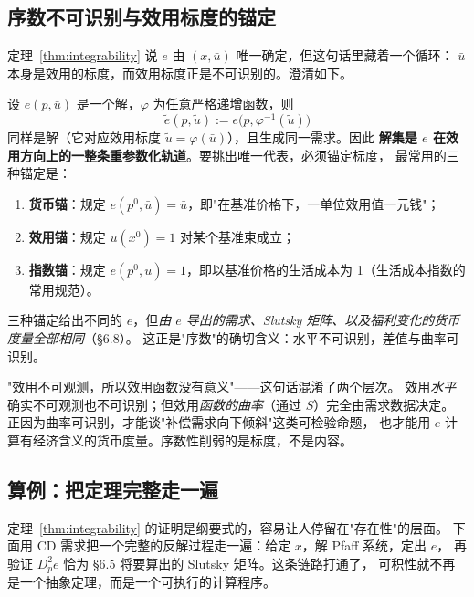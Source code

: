 \subsection{序数不可识别与效用标度的锚定}

定理~\ref{thm:integrability} 说 $e$ 由 $(x,\bar u)$ 唯一确定，但这句话里藏着一个循环：
$\bar u$ 本身是效用的标度，而效用标度正是不可识别的。澄清如下。

设 $e(p,\bar u)$ 是一个解，$\varphi$ 为任意严格递增函数，则
\[
 \tilde e(p,\tilde u):=e\bigl(p,\varphi^{-1}(\tilde u)\bigr)
\]
同样是解（它对应效用标度 $\tilde u=\varphi(\bar u)$），且生成同一需求。因此
\textbf{解集是 $e$ 在效用方向上的一整条重参数化轨道}。要挑出唯一代表，必须锚定标度，
最常用的三种锚定是：
\begin{enumerate}
\item \textbf{货币锚}：规定 $e(p^0,\bar u)=\bar u$，即"在基准价格下，一单位效用值一元钱"；
\item \textbf{效用锚}：规定 $u(x^0)=1$ 对某个基准束成立；
\item \textbf{指数锚}：规定 $e(p^0,\bar u)=1$，即以基准价格的生活成本为 1（生活成本指数的常用规范）。
\end{enumerate}
三种锚定给出不同的 $e$，但\emph{由 $e$ 导出的需求、Slutsky 矩阵、以及福利变化的货币度量全部相同}（\S 6.8）。
这正是"序数"的确切含义：水平不可识别，差值与曲率可识别。

\begin{remark}[一个常见误解]
"效用不可观测，所以效用函数没有意义"——这句话混淆了两个层次。
效用\emph{水平}确实不可观测也不可识别；但效用\emph{函数的曲率}（通过 $S$）完全由需求数据决定。
正因为曲率可识别，才能谈"补偿需求向下倾斜"这类可检验命题，
也才能用 $e$ 计算有经济含义的货币度量。序数性削弱的是标度，不是内容。
\end{remark}

\subsection{算例：把定理完整走一遍}

定理~\ref{thm:integrability} 的证明是纲要式的，容易让人停留在"存在性"的层面。
下面用 CD 需求把一个完整的反解过程走一遍：给定 $x$，解 Pfaff 系统，定出 $e$，
再验证 $D_p^2e$ 恰为 \S 6.5 将要算出的 Slutsky 矩阵。这条链路打通了，
可积性就不再是一个抽象定理，而是一个可执行的计算程序。

